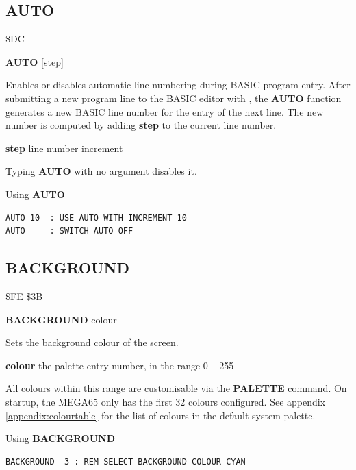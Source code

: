 
\newpage
\subsection{AUTO}
\begin{description}[leftmargin=2cm,style=nextline]
\item [Token:] \$DC
\item [Format:]
  {\bf AUTO} [step]
\item [Usage:] Enables or disables automatic line numbering during BASIC program entry.
  After submitting a new program line to the BASIC editor with
  , the {\bf AUTO} function generates a new BASIC line
  number for the entry of the next line. The new number is
  computed by adding {\bf step} to the current line number.

  {\bf step} line number increment

  Typing {\bf AUTO} with no argument disables it.

\item [Examples:] Using {\bf AUTO}
\begin{tcolorbox}[colback=black,coltext=white]
\verbatimfont{\codefont}
\begin{verbatim}
AUTO 10  : USE AUTO WITH INCREMENT 10
AUTO     : SWITCH AUTO OFF
\end{verbatim}
\end{tcolorbox}
\end{description}


\newpage
\subsection{BACKGROUND}
\begin{description}[leftmargin=2cm,style=nextline]
\item [Token:] \$FE \$3B
\item [Format:] {\bf BACKGROUND} colour
\item [Usage:] Sets the background colour
               of the screen.

               {\bf colour} the palette entry number, in the range 0 -- 255

               All colours within this range are customisable via the {\bf
               PALETTE} command. On startup, the MEGA65 only has the first 32
               colours configured. See appendix \vref{appendix:colourtable}
               for the list of colours in the default system palette.

\item [Example:] Using {\bf BACKGROUND}
\begin{tcolorbox}[colback=black,coltext=white]
\verbatimfont{\codefont}
\begin{verbatim}
BACKGROUND  3 : REM SELECT BACKGROUND COLOUR CYAN
\end{verbatim}
\end{tcolorbox}
\end{description}

